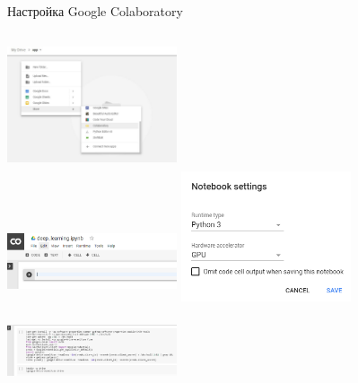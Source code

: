 \documentclass{beamer}
\begin{document}
\begin{frame}{Настройка Google Colaboratory}

\begin{columns}[t]
\centering
\includegraphics[width=5cm,height=3.5cm]{colab_settings_1.jpeg}\\ %
\includegraphics[width=5cm,height=2.5cm]{colab_settings_3.png}    %
\centering
\includegraphics[width=5cm,height=4cm]{colab_settings_2.png}\\    %
\includegraphics[width=5cm,height=2.5cm]{colab_settings_4.png}    %
\end{columns}

\end{frame}
\end{document}
